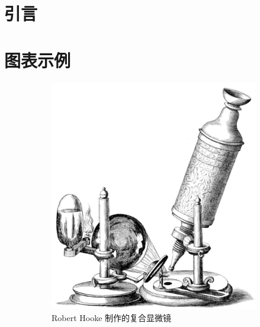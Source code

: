 \documentclass[12pt]{ctexart}
\begin{document}
\section{引言}

\section{图表示例}

\begin{figure}[htbp]
    \begin{subfigure}{0.31\textwidth}
        \includegraphics[width=\linewidth]{fig1.jpeg}
        \caption{Robert Hooke 制作的复合显微镜}
    \end{subfigure}%
    \hfill
    \begin{subfigure}{0.31\textwidth}

\end{subfigure}
\end{figure}
\end{document}

